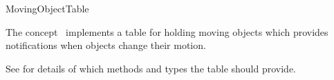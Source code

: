 

\begin{ccRefConcept}{MovingObjectTable}


\ccDefinition
  
The concept \ccRefName\ implements a table for holding moving objects which provides notifications when objects change their motion.

See  for details of which methods and types the table should provide. 







\ccHasModels





\end{ccRefConcept}


